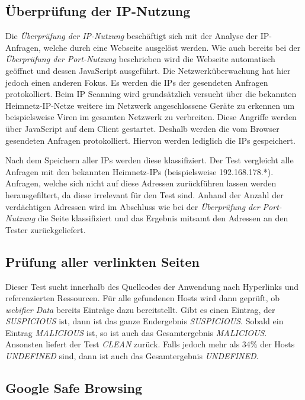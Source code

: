 \subsection{Überprüfung der IP-Nutzung}
Die \textit{Überprüfung der IP-Nutzung} beschäftigt sich mit der Analyse der IP-Anfragen, welche
durch eine Webseite ausgelöst werden. Wie auch bereits bei der \textit{Überprüfung der Port-Nutzung}
beschrieben wird die Webseite automatisch geöffnet und dessen JavaScript ausgeführt. Die
Netzwerküberwachung hat hier jedoch einen anderen Fokus. Es werden die IPs der gesendeten Anfragen
protokolliert. Beim IP Scanning wird grundsätzlich versucht über die bekannten Heimnetz-IP-Netze
weitere im Netzwerk angeschlossene Geräte zu erkennen um beispielsweise Viren im gesamten Netzwerk
zu verbreiten. Diese Angriffe werden über JavaScript auf dem Client gestartet. Deshalb werden die
vom Browser gesendeten Anfragen protokolliert. Hiervon werden lediglich die IPs gespeichert.

Nach dem Speichern aller IPs werden diese klassifiziert. Der Test vergleicht alle Anfragen mit den
bekannten Heimnetz-IPs (beispielsweise 192.168.178.*). Anfragen, welche sich nicht auf diese
Adressen zurückführen lassen werden herausgefiltert, da diese irrelevant für den Test sind. Anhand
der Anzahl der verdächtigen Adressen wird im Abschluss wie bei der \textit{Überprüfung der
Port-Nutzung} die Seite klassifiziert und das Ergebnis mitsamt den Adressen an den
Tester zurückgeliefert.

\subsection{Prüfung aller verlinkten Seiten}
\label{sec:konzept-linkchecker}

Dieser Test sucht innerhalb des Quellcodes der Anwendung nach Hyperlinks und referenzierten Ressourcen.
Für alle gefundenen Hosts wird dann geprüft, ob \textit{webifier Data} bereits Einträge dazu
bereitstellt.
Gibt es einen Eintrag, der \textit{SUSPICIOUS} ist, dann ist das ganze Endergebnis \textit{SUSPICIOUS}.
Sobald ein Eintrag \textit{MALICIOUS} ist, so ist auch das Gesamtergebnis \textit{MALICIOUS}.
Ansonsten liefert der Test \textit{CLEAN} zurück. Falls jedoch mehr als 34\% der Hosts
\textit{UNDEFINED} sind, dann ist auch das Gesamtergebnis \textit{UNDEFINED}.

\subsection{Google Safe Browsing}

